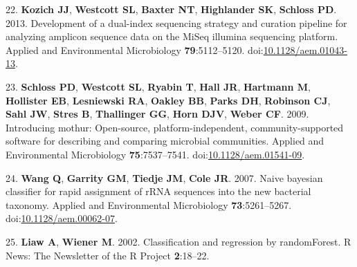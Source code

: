 \documentclass[11pt,]{article}
\begin{document}
\hypertarget{ref-Kozich2013}{}
22. \textbf{Kozich JJ}, \textbf{Westcott SL}, \textbf{Baxter NT},
\textbf{Highlander SK}, \textbf{Schloss PD}. 2013. Development of a
dual-index sequencing strategy and curation pipeline for analyzing
amplicon sequence data on the MiSeq illumina sequencing platform.
Applied and Environmental Microbiology \textbf{79}:5112--5120.
doi:\href{https://doi.org/10.1128/aem.01043-13}{10.1128/aem.01043-13}.

\hypertarget{ref-Schloss2009}{}
23. \textbf{Schloss PD}, \textbf{Westcott SL}, \textbf{Ryabin T},
\textbf{Hall JR}, \textbf{Hartmann M}, \textbf{Hollister EB},
\textbf{Lesniewski RA}, \textbf{Oakley BB}, \textbf{Parks DH},
\textbf{Robinson CJ}, \textbf{Sahl JW}, \textbf{Stres B},
\textbf{Thallinger GG}, \textbf{Horn DJV}, \textbf{Weber CF}. 2009.
Introducing mothur: Open-source, platform-independent,
community-supported software for describing and comparing microbial
communities. Applied and Environmental Microbiology
\textbf{75}:7537--7541.
doi:\href{https://doi.org/10.1128/aem.01541-09}{10.1128/aem.01541-09}.

\hypertarget{ref-Wang2007}{}
24. \textbf{Wang Q}, \textbf{Garrity GM}, \textbf{Tiedje JM},
\textbf{Cole JR}. 2007. Naive bayesian classifier for rapid assignment
of rRNA sequences into the new bacterial taxonomy. Applied and
Environmental Microbiology \textbf{73}:5261--5267.
doi:\href{https://doi.org/10.1128/aem.00062-07}{10.1128/aem.00062-07}.

\hypertarget{ref-Liaw2002}{}
25. \textbf{Liaw A}, \textbf{Wiener M}. 2002. Classification and
regression by randomForest. R News: The Newsletter of the R Project
\textbf{2}:18--22.
\end{document}
